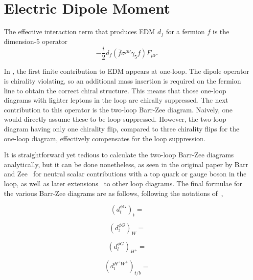\chapter{Electric Dipole Moment}
\label{ch:EDM}

The effective interaction term that produces EDM \(d_{f} \) for a fermion \(f \) is the dimension-5 operator
\begin{equation}
  -\frac{i}{2}d_{f}\left(\bar{f}\sigma^{\mu\nu}\gamma_{5}f\right)F_{\mu\nu}.
\end{equation}

In {\gthdm}, the first finite contribution to EDM appears at one-loop.
The dipole operator is chirality violating, so an additional mass insertion is required on the fermion line to obtain the correct chiral structure.
This means that those one-loop diagrams with lighter leptons in the loop are chirally suppressed.
The next contribution to this operator is the two-loop Barr-Zee diagram. 
Naively, one would directly assume these to be loop-suppressed. 
However, the two-loop diagram having only one chirality flip, compared to three chirality flips for the one-loop diagram, 
effectively compensates for the loop suppression.

It is straightforward yet tedious to calculate the two-loop Barr-Zee diagrams analytically, but it can be done nonetheless, 
as seen in the original paper by Barr and Zee~\cite{BarrZee} for neutral scalar contributions with a top quark or gauge boson in the loop,
as well as later extensions~\cite{MoreBarrZee} to other loop diagrams.
The final formulae for the various Barr-Zee diagrams are as follows, following the notations of~\cite{Abe},

\begin{equation}\label{eq:EDM-neutralScalar-toploop}
	(d^{\phi G}_{l})_{t} = 
\end{equation}

\begin{equation}\label{eq:EDM-neutralScalar-Wloop}
	(d^{\phi G}_{l})_{W} = 
\end{equation}

\begin{equation}\label{eq:EDM-neutralScalar-cHloop}
	(d^{\phi G}_{l})_{H^{+}} = 
\end{equation}

\begin{equation}\label{eq:EDM-chargedScalar-tbloop}
	(d^{H^{+}W^{+}}_{l})_{t/b} = 
\end{equation}

